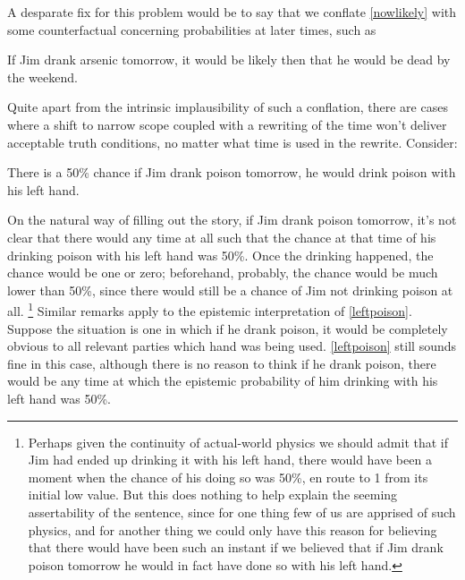 \documentclass[If.tex]{subfiles}
\begin{document}
A desparate fix for this problem would be to say that we conflate \ref{nowlikely} with some counterfactual concerning probabilities at later times, such as
\begin{prop}
\nitem \label{wouldbelikelythen}
  If Jim drank arsenic tomorrow, it would be likely then that he would be dead by the weekend.
\end{prop}
Quite apart from the intrinsic implausibility of such a conflation, there are cases where a shift to narrow scope coupled with a rewriting of the time won't deliver acceptable truth conditions, no matter what time is used in the rewrite. Consider:
\begin{prop}
\nitem \label{leftpoison}
  There is a 50\% chance if Jim drank poison tomorrow, he would drink poison with his left hand.
\end{prop}
On the natural way of filling out the story, if Jim drank poison tomorrow, it's not clear that there would any time at all such that the chance at that time of his drinking poison with his left hand was 50\%. Once the drinking happened, the chance would be one or zero; beforehand, probably, the chance would be much lower than 50\%, since there would still be a chance of Jim not drinking poison at all.%
\footnote{Perhaps given the continuity of actual-world physics we should admit that if Jim had ended up drinking it with his left hand, there would have been a moment when the chance of his doing so was 50\%, en route to 1 from its initial low value. But this does nothing to help explain the seeming assertability of the sentence, since for one thing few of us are apprised of such physics, and for another thing we could only have this reason for believing that there would have been such an instant if we believed that if Jim drank poison tomorrow he would in fact have done so with his left hand.}
Similar remarks apply to the epistemic interpretation of \ref{leftpoison}. Suppose the situation is one in which if he drank poison, it would be completely obvious to all relevant parties which hand was being used. \ref{leftpoison} still sounds fine in this case, although there is no reason to think if he drank poison, there would be any time at which the epistemic probability of him drinking with his left hand was 50\%.


\end{document}
